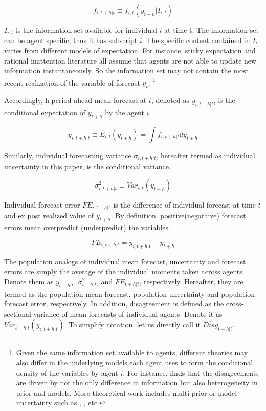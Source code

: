 \documentclass[12pt]{article}
\begin{document}
	$$f_{i,t+h|t} \equiv f_{i,t}(y_{t+h}|I_{i,t})$$
	
	
	$I_{i,t}$ is the information set available for individual $i$ at time t. The information set can be agent specific, thus it has subscript $i$.  The specific content contained in $I_t$ varies from different models of expectation. For instance, sticky expectation and rational inattention literature all assume that agents are not able to update new information instantaneously. So the information set may not contain the most recent realization of the variable of forecast $y_t$. \footnote{Given the same information set available to agents, different theories may also differ in the underlying models each agent uses to form the conditional density of the variables by agent $i$. For instance, \citet{patton2010forecasters} finds that the disagreements are driven by not the only difference in information but also heterogeneity in prior and models. More theoretical work includes multi-prior or model uncertainty such as \citet{hansen2001robust}, \citet{hansen2008robustness}, etc.}
	
	Accordingly, h-period-ahead mean forecast at $t$, denoted as $ y_{i,t+h|t}$, is the conditional expectation of $y_{t+h}$ by the agent $i$. 
	
	$$y_{i,t+h|t} \equiv E_{i,t}(y_{t+h}) =\int f_{i, t+h|t} d y_{t+h}$$
	
	Similarly, individual forecasting variance $\sigma_{i,t+h|t}$, hereafter termed as individual uncertainty in this paper, is the conditional variance.
	
	$$\sigma^2_{i,t+h|t} \equiv Var_{i,t}( y_{t+h} )$$
	
	Individual forecast error $FE_{i,t+h|t}$ is the difference of individual forecast at time $t$ and ex post realized value of $y_{t+h}$.  By definition. positive(negataive) forecast errors mean overpredict (underpredict) the variables.
	
	$$FE_{i,t+h|t} = y_{i,t+h|t} - y_{t+h}$$
	
	The population analogs of individual mean forecast, uncertainty and forecast errors are simply the average of the individual moments taken across agents. Denote them as $\bar y_{t+h|t}$, $\bar \sigma^2_{t+h|t}$, and $\overline{FE}_{t+h|t}$, respectively. Hereafter, they are termed as the population mean forecast, population uncertainty and population forecast error, respectively. In addition, disagreement is defined as the cross-sectional variance of mean forecasts of individual agents.  Denote it as $\overline{Var}_{t+h|t}(y_{i,t+h|t}) $. To simplify notation, let us directly call it $\overline{Disg}_{t+h|t}$.  
	
\end{document}
